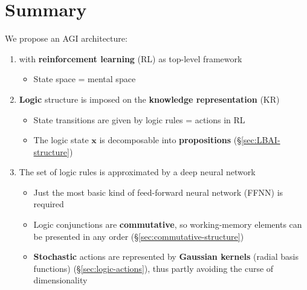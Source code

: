 \documentclass[orivec]{llncs}
\newcommand{\vect}[1]{\boldsymbol{#1}}
\begin{document}


\setcounter{section}{-1}
\section{Summary}
\label{sec:0}

We propose an AGI architecture:
\begin{enumerate}
	\item with \textbf{reinforcement learning} (RL) as top-level framework
	\begin{itemize}
		\item State space = mental space
	\end{itemize}
	\item \textbf{Logic} structure is imposed on the \textbf{knowledge representation} (KR)
		\begin{itemize}
		\item State transitions are given by logic rules = actions in RL
		\item The logic state $\vect{x}$ is decomposable into \textbf{propositions} (\S\ref{sec:LBAI-structure})
		\end{itemize}
	\item The set of logic rules is approximated by a deep neural network
		\begin{itemize}
		\item Just the most basic kind of feed-forward neural network (FFNN) is required
		\item Logic conjunctions are \textbf{commutative}, so working-memory elements can be presented in any order (\S\ref{sec:commutative-structure})
		\item \textbf{Stochastic} actions are represented by \textbf{Gaussian kernels} (radial basis functions) (\S\ref{sec:logic-actions}), thus partly avoiding the curse of dimensionality
	\end{itemize}
\end{enumerate}
\end{document}
